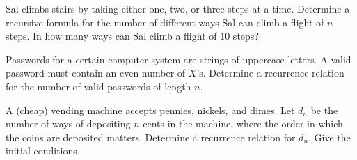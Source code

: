%
%


\begin{prob}
Sal climbs stairs by taking either one, two, or three steps at a time. Determine a recursive formula for the number of different ways Sal can climb a flight of $n$ steps. In how many ways can Sal climb a flight of $10$ steps?
\end{prob}

\begin{prob}
Passwords for a certain computer system are strings of uppercase letters. A valid password must contain an even number of $X$'s. Determine a recurrence relation for 
the number of valid passwords of length $n$.
\end{prob}
%
%
%

\begin{prob}
A (cheap) vending machine accepts pennies, nickels, and dimes. Let $d_n$ be the number of ways of depositing $n$ cents in the machine, where the order in which the 
coins are deposited matters. Determine a recurrence relation for $d_n$. Give the initial conditions.
\end{prob}
%
%
%
%


